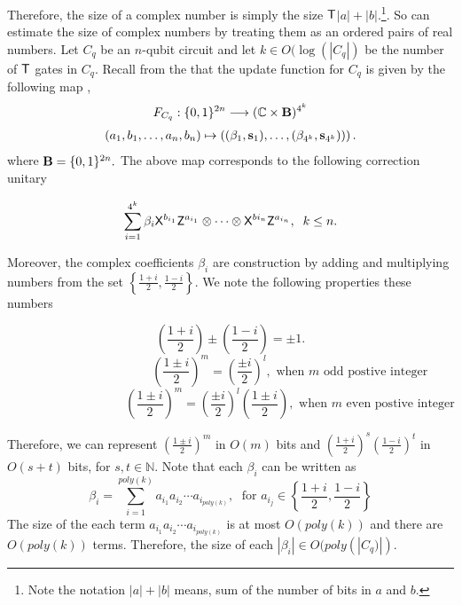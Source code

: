 Therefore, the size of a complex number is simply the size ${\sf T}$$|a|+|b|.$\footnote{Note the notation $|a|+|b|$ means, sum of the number of bits in $a$ and $b.$}. So can estimate the size of complex numbers by treating them as an ordered pairs of real numbers. Let $C_q$ be an $n$-qubit circuit and let $k\in O(\log(|C_q|)$ be the number of ${\sf T}$ gates in $C_q.$ Recall from the that the update function for $C_q$ is given by the following map ,
\begin{equation}
\begin{aligned}
 F_{C_q}: \{0,1\}^{2n}\longrightarrow  (\mathbb{C} \times {\bf B})^{4^k}
 \end{aligned}
\end{equation}
\begin{equation}
\begin{aligned}
 (a_1,b_1,\ldots, a_n,b_n) \mapsto \left((\beta_1, {\bf s}_1),\dots, (\beta_{4^k}, {\bf s}_{4^k}))\right).
\end{aligned}
\end{equation}      
where ${\bf B}=\{0,1\}^{2n}.$ The above map corresponds to the following correction unitary 

 \begin{equation*}
\sum_{i=1}^{4^k} \beta_i {\sf X}^{b_{i_1}} {\sf Z}^{a_{i_1}}\otimes \cdots \otimes {\sf X}^{b{i_n}} {\sf Z}^{a_{i_n}},\;  \; k\leq n.
\end{equation*}
 
Moreover, the complex coefficients $\beta_i$ are construction by adding and multiplying numbers from the set $\left\{\frac{1+i}{2},\frac{1-i}{2}\right\}.$ We note the following properties these numbers

 $$\left(\frac{1+i}{2}\right)\pm \left(\frac{1-i}{2}\right)=\pm1.$$
$$ \hspace{4cm}\left(\frac{1\pm i}{2}\right)^m=\left(\frac{\pm i}{2}\right)^l, \mbox{ when $m$ odd postive integer}$$
 $$\hspace{4cm}\left(\frac{1\pm i}{2}\right)^m=\left(\frac{\pm i}{2}\right)^l \left(\frac{1\pm i}{2}\right), \mbox{ when $m$ even postive integer}$$
  
 

 Therefore, we can represent $\left(\frac{1\pm i}{2}\right)^m$ in $O(m)$ bits  and $\left(\frac{1+ i}{2}\right)^{s} \left(\frac{1- i}{2}\right)^{t}$ in $O(s+t)$ bits, for $s,t\in\mathbb{N}.$ 
 Note that each $\beta_i$ can be written as 
 $$\beta_i=\sum_{i=1}^{poly(k)}a_{i_1}a_{i_2}\cdots a_{i_{poly(k)}},\; \mbox{ for } a_{i_j}\in\left\{\frac{1+i}{2},\frac{1-i}{2}\right\}$$
The size of the each term $a_{i_1}a_{i_2}\cdots a_{i_{poly(k)}}$ is at most $O(poly(k))$ and there are $O(poly(k))$ terms. Therefore, the size of each $|\beta_i|\in O(poly(|C_q)|).$


